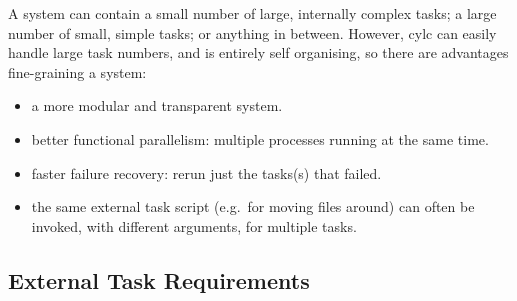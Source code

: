 \documentclass[11pt,a4paper]{article}
\begin{document}
A system can contain a small number of large, internally complex tasks;
a large number of small, simple tasks; or anything in between. However,
cylc can easily handle large task numbers, and is entirely self
organising, so there are advantages fine-graining a system:

\begin{itemize}
    \item a more modular and transparent system.

    \item better functional parallelism: multiple processes running
        at the same time.

    \item faster failure recovery: rerun just the tasks(s) that failed. 

    \item the same external task script (e.g.\ for moving files around)
        can often be invoked, with different arguments, for multiple
        tasks.

\end{itemize}



\subsection{External Task Requirements} 
\label{ExternalTaskRequirements}
\end{document}
